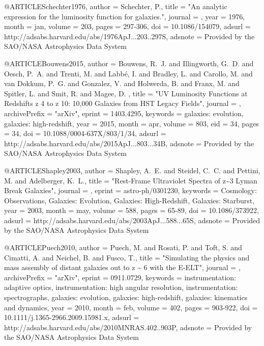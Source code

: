 \documentclass{aa}
\begin{document}
{{@ARTICLE{Schechter1976,
   author = {{Schechter}, P.},
    title = "{An analytic expression for the luminosity function for galaxies.}",
  journal = {\apj},
     year = 1976,
    month = jan,
   volume = 203,
    pages = {297-306},
      doi = {10.1086/154079},
   adsurl = {http://adsabs.harvard.edu/abs/1976ApJ...203..297S},
  adsnote = {Provided by the SAO/NASA Astrophysics Data System}
}

@ARTICLE{Bouwens2015,
   author = {{Bouwens}, R.~J. and {Illingworth}, G.~D. and {Oesch}, P.~A. and 
	{Trenti}, M. and {Labb{\'e}}, I. and {Bradley}, L. and {Carollo}, M. and 
	{van Dokkum}, P.~G. and {Gonzalez}, V. and {Holwerda}, B. and 
	{Franx}, M. and {Spitler}, L. and {Smit}, R. and {Magee}, D.
	},
    title = "{UV Luminosity Functions at Redshifts z {\tilde} 4 to z {\tilde} 10: 10,000 Galaxies from HST Legacy Fields}",
  journal = {\apj},
archivePrefix = "arXiv",
   eprint = {1403.4295},
 keywords = {galaxies: evolution, galaxies: high-redshift},
     year = 2015,
    month = apr,
   volume = 803,
      eid = {34},
    pages = {34},
      doi = {10.1088/0004-637X/803/1/34},
   adsurl = {http://adsabs.harvard.edu/abs/2015ApJ...803...34B},
  adsnote = {Provided by the SAO/NASA Astrophysics Data System}
}

@ARTICLE{Shapley2003,
   author = {{Shapley}, A.~E. and {Steidel}, C.~C. and {Pettini}, M. and 
	{Adelberger}, K.~L.},
    title = "{Rest-Frame Ultraviolet Spectra of z\~{}3 Lyman Break Galaxies}",
  journal = {\apj},
   eprint = {astro-ph/0301230},
 keywords = {Cosmology: Observations, Galaxies: Evolution, Galaxies: High-Redshift, Galaxies: Starburst},
     year = 2003,
    month = may,
   volume = 588,
    pages = {65-89},
      doi = {10.1086/373922},
   adsurl = {http://adsabs.harvard.edu/abs/2003ApJ...588...65S},
  adsnote = {Provided by the SAO/NASA Astrophysics Data System}
}

@ARTICLE{Puech2010,
   author = {{Puech}, M. and {Rosati}, P. and {Toft}, S. and {Cimatti}, A. and 
	{Neichel}, B. and {Fusco}, T.},
    title = "{Simulating the physics and mass assembly of distant galaxies out to z \~{} 6 with the E-ELT}",
  journal = {\mnras},
archivePrefix = "arXiv",
   eprint = {0911.0729},
 keywords = {instrumentation: adaptive optics, instrumentation: high angular resolution, instrumentation: spectrographs, galaxies: evolution, galaxies: high-redshift, galaxies: kinematics and dynamics},
     year = 2010,
    month = feb,
   volume = 402,
    pages = {903-922},
      doi = {10.1111/j.1365-2966.2009.15981.x},
   adsurl = {http://adsabs.harvard.edu/abs/2010MNRAS.402..903P},
  adsnote = {Provided by the SAO/NASA Astrophysics Data System}
}

}}
\end{document}
